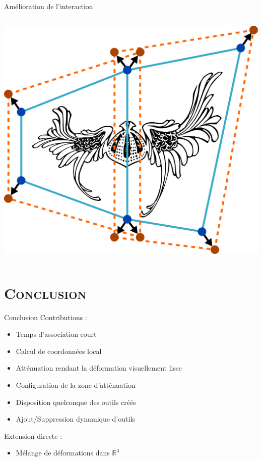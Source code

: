 \documentclass[xcolor=x11names,compress]{beamer}
\renewcommand{\(}{\begin{columns}} \renewcommand{\)}{\end{columns}}
\newcommand{\<}[1]{\begin{column}{#1}} \renewcommand{\>}{\end{column}}
\begin{document}
\begin{frame}{Amélioration de l'interaction}
\begin{columns}[t]
\begin{column}{0.5\textwidth}
      \includegraphics[scale=0.15]{Deformation-Viking-Apres-Avec}
    \end{column}
  \end{columns}
\end{frame}

\section{\scshape Conclusion}

\begin{frame}{Conclusion}
  Contributions :
  \begin{itemize}
    \item Temps d'association court
    \item Calcul de coordonnées local
    \item Atténuation rendant la déformation visuellement lisse
    \item Configuration de la zone d'atténuation
    \item Disposition quelconque des outils créés
    \item Ajout/Suppression dynamique d'outils
  \end{itemize}
  Extension directe : 
  \begin{itemize}
    \item Mélange de déformations dans $\mathbb{R}^3$
  \end{itemize}
\end{frame}
\end{document}
